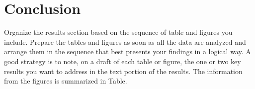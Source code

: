 \documentclass[10pt,conference,compsocconf]{IEEEtran}
\begin{document}
    \section{Conclusion}

    Organize the results section based on the sequence of table and
    figures you include. Prepare the tables and figures as soon as all
    the data are analyzed and arrange them in the sequence that best
    presents your findings in a logical way. A good strategy is to note,
    on a draft of each table or figure, the one or two key results you
    want to address in the text portion of the results.
    The information from the figures is
    summarized in Table.




    
    
\end{document}
